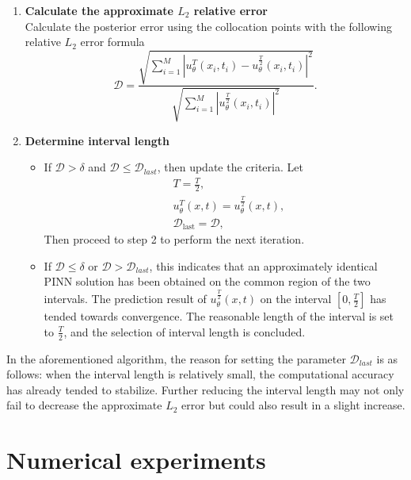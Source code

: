\documentclass[preprint]{elsarticle}
\numberwithin{table}{section}
\numberwithin{equation}{section}
\numberwithin{figure}{section}
\begin{document}
\begin{CJK}{UTF8}{gbsn}
\begin{enumerate}
\item
\textbf{Calculate the approximate $L_2$ relative error}\\
Calculate the posterior error using the collocation points with the following relative $L_2$ error formula
\begin{equation}\label{YYYYZ}
\mathcal{D} = \frac{\sqrt{\sum_{i=1}^{M} \left| u_\theta^{T}(x_{i}, t_{i}) - u_\theta^{\frac{T}{2}}(x_{i}, t_{i}) \right|^{2}}}{\sqrt{\sum_{i=1}^{M} \left| u_\theta^{\frac{T}{2}}(x_{i}, t_{i}) \right|^{2}}}.
\end{equation}

\item 
\textbf{Determine interval length}
\begin{itemize}
    \item 
     If $\mathcal{D} >\delta$ and
$\mathcal{D} \le \mathcal{D}_{last}$, then update the criteria. Let
\begin{align}
    &T = \frac{T}{2}, \\
    &u_{\theta}^{T}(x,t) = u_{\theta}^{\frac{T}{2}}(x,t), \\
    &\mathcal{D}_{\text{last}} = \mathcal{D},
\end{align}
Then proceed to step 2 to perform the next iteration.
\item 
    If $\mathcal{D}\le\delta$ or $\mathcal{D}>\mathcal{D}_{last}$, 
    this indicates that an approximately identical PINN solution has been obtained on the common region of the two intervals. The prediction result of $u_\theta^{\frac{T}{2}}(x,t)$ on the interval $[0,\frac{T}{2}]$ has tended towards convergence. The reasonable length of the interval is set to $\frac{T}{2}$, and the selection of interval length is concluded.
    
     
\end{itemize}
\end{enumerate}

 
In the aforementioned algorithm, the reason for setting the parameter $\mathcal{D}_{last}$  is as follows: when the interval length is relatively small, the computational accuracy has already tended to stabilize. Further reducing the interval length may not only fail to decrease the approximate $L_2$  error but could also result in a slight increase.  
 


\section{Numerical experiments}\label{sec4}
 


\end{CJK}
\end{document}
